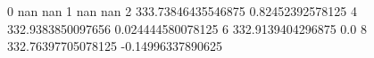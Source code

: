 0 nan nan
1 nan nan
2 333.73846435546875 0.82452392578125
4 332.9383850097656 0.024444580078125
6 332.9139404296875 0.0
8 332.76397705078125 -0.14996337890625
